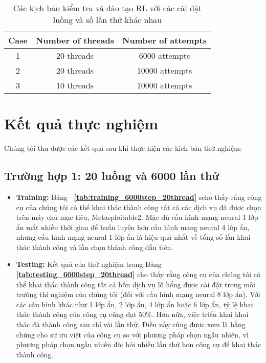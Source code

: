 \begin{table}[!t]
    \centering
    \caption{Các kịch bản kiểm tra và đào tạo RL với các cài đặt luồng và số lần thử khác nhau}
    \label{tab:Thread_Trial}
    \begin{tabular}{|c|c|c|}
    \hline
    \textbf{Case} & \textbf{Number of threads}     & \textbf{Number of attempts}  \\ 
    \hline
    1   & 20 threads  & 6000 attempts     \\ 
    \hline
    2   & 20 threads  & 10000 attempts    \\ 
    \hline
    3   & 10 threads  & 10000 attempts    \\ 
    \hline
    \end{tabular}
    
\end{table}

\section{Kết quả thực nghiệm}

Chúng tôi thu được các kết quả sau khi thực hiện các kịch bản thử nghiệm:

\subsection{Trường hợp 1: 20 luồng và 6000 lần thử}

\begin{itemize}
    \item \textbf{Training:} Bảng \textbf{~\ref{tab:training_6000step_20thread}} scho thấy rằng công cụ của chúng tôi có thể khai thác thành công tất cả các dịch vụ đã được chọn trên máy chủ mục tiêu, Metasploitable2. Mặc dù cấu hình mạng neural 1 lớp ẩn mất nhiều thời gian để huấn luyện hơn cấu hình mạng neural 4 lớp ẩn, nhưng cấu hình mạng neural 1 lớp ẩn là hiệu quả nhất về tổng số lần khai thác thành công và lần chọn thành công đầu tiên.  
    \item \textbf{Testing:} Kết quả của thử nghiệm trong Bảng \textbf{\ref{tab:testing_6000step_20thread}} cho thấy rằng công cụ của chúng tôi có thể khai thác thành công tất cả bốn dịch vụ lỗ hổng được cài đặt trong môi trường thí nghiệm của chúng tôi (đối với cấu hình mạng neural 8 lớp ẩn). Với các cấu hình khác như 1 lớp ẩn, 2 lớp ẩn, 4 lớp ẩn hoặc 6 lớp ẩn, tỷ lệ khai thác thành công của công cụ cũng đạt 50\%. Hơn nữa, việc triển khai khai thác đã thành công sau chỉ vài lần thử. Điều này cũng được xem là bằng chứng cho sự ưu việt của công cụ so với phương pháp chọn ngẫu nhiên, vì phương pháp chọn ngẫu nhiên đòi hỏi nhiều lần thử hơn công cụ để khai thác thành công.
\end{itemize}
        
